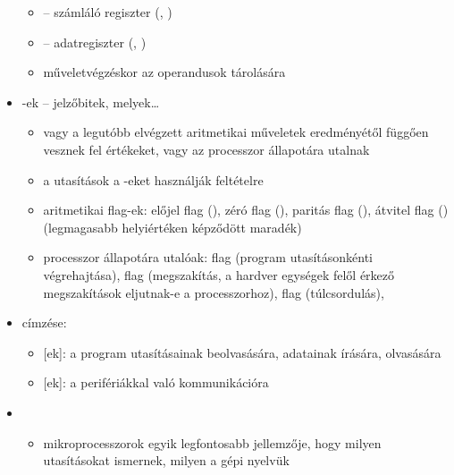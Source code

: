 \documentclass[../main.tex]{subfiles}
\begin{document}
\begin{itemize}
\begin{itemize}
		      \item {} – számláló regiszter
		            (, )

		      \item {} – adatregiszter
		            (, )

		      \item műveletvégzéskor az operandusok tárolására
	      \end{itemize}

	\item {}-ek – jelzőbitek, melyek\dots
	      \begin{itemize}
		      \item vagy a legutóbb elvégzett aritmetikai
		            műveletek eredményétől függően vesznek fel értékeket,
		            vagy az processzor állapotára utalnak

		      \item a  utasítások
		            a -eket használják feltételre

		      \item aritmetikai flag-ek:
		            előjel flag (),
		            zéró flag (),
		            paritás flag (),
		            átvitel flag ()
		            (legmagasabb helyiértéken képződött maradék)

		      \item processzor állapotára utalóak:
		             flag (program utasításonkénti végrehajtása),
		             flag (megszakítás,
		            a hardver egységek felől érkező megszakítások
		            eljutnak-e a processzorhoz),
		             flag (túlcsordulás),
	      \end{itemize}

	\item {} címzése:
	      \begin{itemize}
		      \item {}[ek]:
		            a program utasításainak beolvasására,
		            adatainak írására, olvasására

		      \item {}[ek]:
		            a perifériákkal való kommunikációra
	      \end{itemize}

	\item {}
	      \begin{itemize}
		      \item mikroprocesszorok egyik legfontosabb jellemzője,
		            hogy milyen utasításokat ismernek, milyen a gépi nyelvük


\end{itemize}
\end{itemize}
\end{document}
